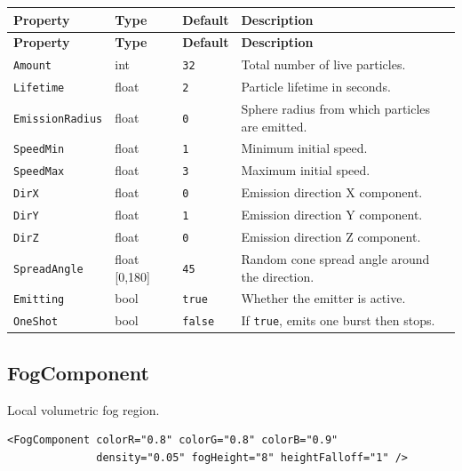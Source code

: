 \documentclass[11pt,a4paper]{article}
\begin{document}
\begin{longtable}{P{3.5cm} P{2cm} P{2.2cm} P{5.3cm}}
  \toprule
  \textbf{Property} & \textbf{Type} & \textbf{Default} & \textbf{Description} \\
  \midrule
  \endfirsthead
  \toprule
  \textbf{Property} & \textbf{Type} & \textbf{Default} & \textbf{Description} \\
  \midrule
  \endhead
  \texttt{Amount} & int & \texttt{32} & Total number of live particles. \\
  \texttt{Lifetime} & float & \texttt{2} & Particle lifetime in seconds. \\
  \texttt{EmissionRadius} & float & \texttt{0} &
    Sphere radius from which particles are emitted. \\
  \texttt{SpeedMin} & float & \texttt{1} & Minimum initial speed. \\
  \texttt{SpeedMax} & float & \texttt{3} & Maximum initial speed. \\
  \texttt{DirX} & float & \texttt{0} & Emission direction X component. \\
  \texttt{DirY} & float & \texttt{1} & Emission direction Y component. \\
  \texttt{DirZ} & float & \texttt{0} & Emission direction Z component. \\
  \texttt{SpreadAngle} & float [0,180] & \texttt{45} &
    Random cone spread angle around the direction. \\
  \texttt{Emitting} & bool & \texttt{true} & Whether the emitter is active. \\
  \texttt{OneShot} & bool & \texttt{false} &
    If \texttt{true}, emits one burst then stops. \\
  \bottomrule
\end{longtable}

\subsection{FogComponent}

Local volumetric fog region.

\begin{lstlisting}
<FogComponent colorR="0.8" colorG="0.8" colorB="0.9"
              density="0.05" fogHeight="8" heightFalloff="1" />
\end{lstlisting}
\end{document}
